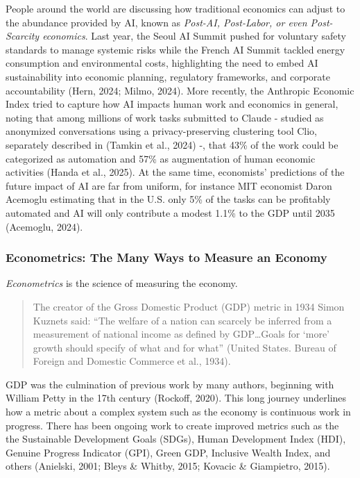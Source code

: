 \documentclass[
  12pt,
  letterpaper,
  DIV=11,
  numbers=noendperiod]{scrartcl}
\begin{document}
People around the world are discussing how traditional economics can
adjust to the abundance provided by AI, known as \emph{Post-AI,
Post-Labor, or even Post-Scarcity economics}. Last year, the Seoul AI
Summit pushed for voluntary safety standards to manage systemic risks
while the French AI Summit tackled energy consumption and environmental
costs, highlighting the need to embed AI sustainability into economic
planning, regulatory frameworks, and corporate accountability (Hern,
2024; Milmo, 2024). More recently, the Anthropic Economic Index tried to
capture how AI impacts human work and economics in general, noting that
among millions of work tasks submitted to Claude - studied as anonymized
conversations using a privacy-preserving clustering tool Clio,
separately described in (Tamkin et al., 2024) -, that 43\% of the work
could be categorized as automation and 57\% as augmentation of human
economic activities (Handa et al., 2025). At the same time, economists'
predictions of the future impact of AI are far from uniform, for
instance MIT economist Daron Acemoglu estimating that in the U.S. only
5\% of the tasks can be profitably automated and AI will only contribute
a modest 1.1\% to the GDP until 2035 (Acemoglu, 2024).

\subsubsection{Econometrics: The Many Ways to Measure an
Economy}\label{econometrics-the-many-ways-to-measure-an-economy}

\emph{Econometrics} is the science of measuring the economy.

\begin{quote}
The creator of the Gross Domestic Product (GDP) metric in 1934 Simon
Kuznets said: ``The welfare of a nation can scarcely be inferred from a
measurement of national income as defined by GDP\ldots Goals for `more'
growth should specify of what and for what'' (United States. Bureau of
Foreign and Domestic Commerce et al., 1934).
\end{quote}

GDP was the culmination of previous work by many authors, beginning with
William Petty in the 17th century (Rockoff, 2020). This long journey
underlines how a metric about a complex system such as the economy is
continuous work in progress. There has been ongoing work to create
improved metrics such as the the Sustainable Development Goals (SDGs),
Human Development Index (HDI), Genuine Progress Indicator (GPI), Green
GDP, Inclusive Wealth Index, and others (Anielski, 2001; Bleys \&
Whitby, 2015; Kovacic \& Giampietro, 2015).
\end{document}
